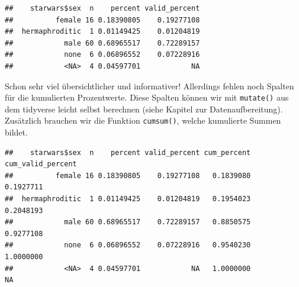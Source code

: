 \documentclass[
]{book}
\newenvironment{Shaded}{\begin{snugshade}}{\end{snugshade}}
\newcommand{\AttributeTok}[1]{\textcolor[rgb]{0.77,0.63,0.00}{#1}}
\newcommand{\CommentTok}[1]{\textcolor[rgb]{0.56,0.35,0.01}{\textit{#1}}}
\newcommand{\FunctionTok}[1]{\textcolor[rgb]{0.00,0.00,0.00}{#1}}
\newcommand{\NormalTok}[1]{#1}
\newcommand{\SpecialCharTok}[1]{\textcolor[rgb]{0.00,0.00,0.00}{#1}}
\begin{document}
\begin{Shaded}
\end{Shaded}

\begin{verbatim}
##    starwars$sex  n    percent valid_percent
##          female 16 0.18390805    0.19277108
##  hermaphroditic  1 0.01149425    0.01204819
##            male 60 0.68965517    0.72289157
##            none  6 0.06896552    0.07228916
##            <NA>  4 0.04597701            NA
\end{verbatim}

Schon sehr viel übersichtlicher und informativer! Allerdings fehlen noch Spalten für die kumulierten Prozentwerte. Diese Spalten können wir mit \texttt{mutate()} aus dem tidyverse leicht selbst berechnen (siehe Kapitel zur Datenaufbereitung). Zusätzlich brauchen wir die Funktion \texttt{cumsum()}, welche kumulierte Summen bildet.

\begin{Shaded}
\end{Shaded}

\begin{verbatim}
##    starwars$sex  n    percent valid_percent cum_percent cum_valid_percent
##          female 16 0.18390805    0.19277108   0.1839080         0.1927711
##  hermaphroditic  1 0.01149425    0.01204819   0.1954023         0.2048193
##            male 60 0.68965517    0.72289157   0.8850575         0.9277108
##            none  6 0.06896552    0.07228916   0.9540230         1.0000000
##            <NA>  4 0.04597701            NA   1.0000000                NA
\end{verbatim}
\end{document}
